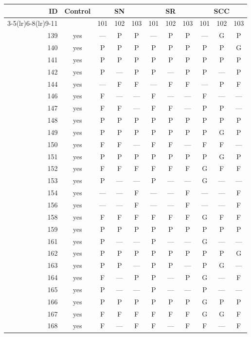 \begin{table}[p]\centering\small
\begin{tabular*}{\textwidth}{@{\extracolsep{\fill}}rc*{9}{c}@{}}\toprule
ID & Control & \multicolumn{3}{c}{SN} & \multicolumn{3}{c}{SR} & \multicolumn{3}{c}{SCC}\\
\cmidrule(lr){3-5}\cmidrule(lr){6-8}\cmidrule(lr){9-11}
 & & 101 & 102 & 103 & 101 & 102 & 103 & 101 & 102 & 103\\\midrule
139 & yes & — & P & P & — & P & P & — & G & P\\
140 & yes & P & P & P & P & P & P & P & P & G\\
141 & yes & P & P & P & P & P & P & P & P & P\\
142 & yes & P & — & P & P & — & P & P & — & P\\
144 & yes & — & F & F & — & F & F & — & P & F\\
146 & yes & F & — & — & F & — & — & F & — & —\\
147 & yes & F & F & — & F & F & — & P & P & —\\
148 & yes & P & P & P & P & P & P & P & P & P\\
149 & yes & P & P & P & P & P & P & P & G & P\\
150 & yes & F & F & — & F & F & — & F & F & —\\
151 & yes & P & P & P & P & P & P & P & G & P\\
152 & yes & F & F & F & F & F & F & G & F & F\\
153 & yes & P & — & — & P & — & — & G & — & —\\
154 & yes & — & — & F & — & — & F & — & — & F\\
156 & yes & — & — & F & — & — & F & — & — & F\\
158 & yes & F & F & F & F & F & F & G & F & F\\
159 & yes & P & P & P & P & P & P & P & P & P\\
161 & yes & P & — & — & P & — & — & G & — & —\\
162 & yes & P & P & P & P & P & P & P & P & G\\
163 & yes & P & P & — & P & P & — & P & G & —\\
164 & yes & F & — & P & P & — & P & G & — & F\\
165 & yes & P & — & — & P & — & — & P & — & —\\
166 & yes & P & P & P & P & P & P & G & P & P\\
167 & yes & F & F & F & F & F & F & G & G & F\\
168 & yes & F & — & F & F & — & F & F & — & F\\

\end{tabular*}
\end{table}
